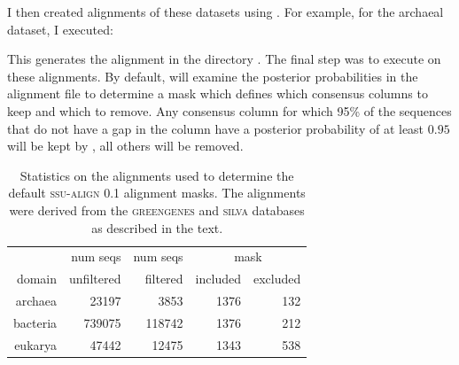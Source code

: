 I then created alignments of these datasets using
. For example, for the archaeal dataset, I executed: 


This generates the alignment  in the
directory .  The final step was to execute
 on these alignments. By default,  will
examine the posterior probabilities in the alignment file to determine
a mask which defines which consensus columns to keep and which to
remove. Any consensus column for which 95\% of the sequences that do
not have a gap in the column have a posterior probability of at least
$0.95$ will be kept by , all others will be removed. 

%
%
%
%
%
% 
% 
\begin{table}
\begin{center}
\begin{tabular}{r|rr|rr}
         & num seqs   & num seqs & \multicolumn{2}{c}{mask} \\ \cline{3-4}
domain   & unfiltered & filtered & included & excluded \\ \hline
archaea  & 23197      & 3853     & 1376     & 132 \\
bacteria & 739075     & 118742   & 1376     & 212 \\
eukarya  & 47442      & 12475    & 1343     & 538 \\ 
\end{tabular}
\caption{Statistics on the alignments used to determine the default
  \textsc{ssu-align} 0.1 alignment masks. The alignments were derived
  from the \textsc{greengenes} \cite{DeSantis06} and \textsc{silva}
  \cite{Pruesse07} databases as described in the text.}
\end{center}
\end{table}

